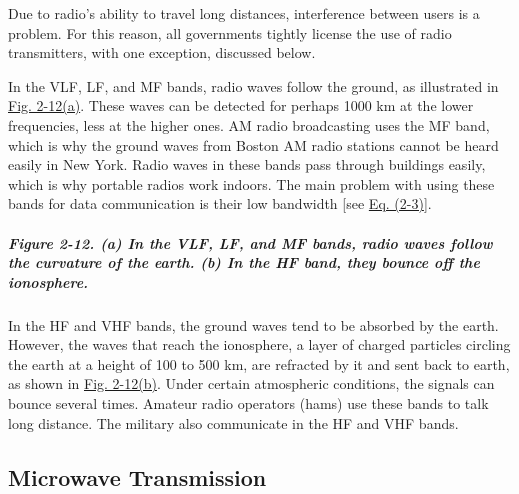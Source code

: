 Due to radio's ability to travel long distances, interference between
users is a problem. For this reason, all governments tightly license the
use of radio transmitters, with one exception, discussed below.

In the VLF, LF, and MF bands, radio waves follow the ground, as
illustrated in
\protect\hyperlink{0130661023_ch02lev1sec3.htmlux5cux23ch02fig12}{Fig.
2-12(a)}. These waves can be detected for perhaps 1000 km at the lower
frequencies, less at the higher ones. AM radio broadcasting uses the MF
band, which is why the ground waves from Boston AM radio stations cannot
be heard easily in New York. Radio waves in these bands pass through
buildings easily, which is why portable radios work indoors. The main
problem with using these bands for data communication is their low
bandwidth {[}see
\protect\hyperlink{0130661023_ch02lev1sec3.htmlux5cux23ch02eq03}{Eq.
(2-3)}{]}.

\subparagraph[Figure 2-12. (a) In the VLF, LF, and MF bands, radio waves
follow the curvature of the earth. (b) In the HF band, they bounce off
the
ionosphere.]{\texorpdfstring{\protect\hypertarget{0130661023_ch02lev1sec3.htmlux5cux23ch02fig12}{}{}Figure
2-12. (a) In the VLF, LF, and MF bands, radio waves follow the curvature
of the earth. (b) In the HF band, they bounce off the
ionosphere.}{Figure 2-12. (a) In the VLF, LF, and MF bands, radio waves follow the curvature of the earth. (b) In the HF band, they bounce off the ionosphere.}}


In the HF and VHF bands, the ground waves tend to be absorbed by the
earth. However, the waves that reach the ionosphere, a layer of charged
particles circling the earth at a height of 100 to 500 km, are refracted
by it and sent back to earth, as shown in
\protect\hyperlink{0130661023_ch02lev1sec3.htmlux5cux23ch02fig12}{Fig.
2-12(b)}. Under certain atmospheric conditions, the signals can bounce
several times. Amateur radio operators (hams) use these bands to talk
long distance. The military also communicate in the HF and VHF bands.

\protect\hypertarget{0130661023_ch02lev1sec3.htmlux5cux23ch02lev2sec10}{}{}

\subsection{Microwave Transmission}


